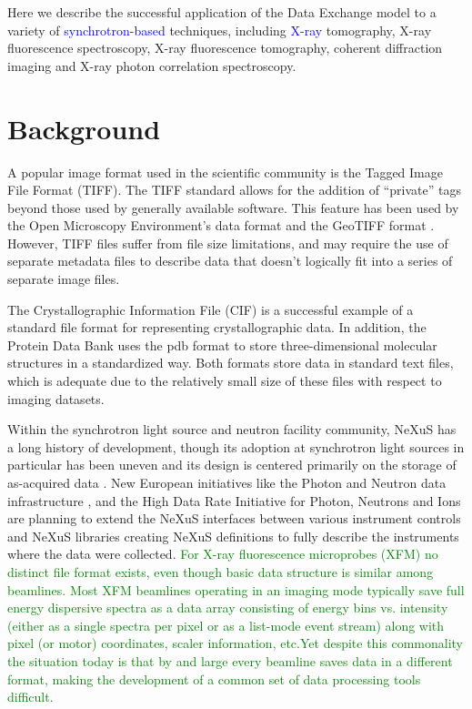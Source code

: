 \documentclass[pdf]{iucr}              %
\begin{document}
Here we describe the successful application of the Data Exchange model to a variety of \textcolor{blue}{synchrotron-based} techniques, including \textcolor{blue}{X-ray} tomography, X-ray fluorescence spectroscopy, X-ray fluorescence tomography, coherent diffraction imaging and X-ray photon correlation spectroscopy.

\section{Background}

A popular image format used in the scientific community is the Tagged Image File Format (TIFF). The TIFF standard allows for the addition of ``private'' tags beyond those used by generally available software. This feature has been used by the Open Microscopy Environment's data format \cite{OME-TIFF} and the GeoTIFF format \cite{GeoTIFF}. However, TIFF files suffer from file size limitations, and may require the use of separate metadata files to describe data that doesn't logically fit into a series of separate image files.

The Crystallographic Information File (CIF) is a successful example of a standard file format for representing crystallographic data. In addition, the Protein Data Bank uses the pdb format \cite{pdb} to store three-dimensional molecular structures in a standardized way. Both formats store data in standard text files, which is adequate due to the relatively small size of these files with respect to imaging datasets.

Within the synchrotron light source and neutron facility community, NeXuS \cite{Tischler1984} has a long history of development, though its adoption at synchrotron light sources in particular has been uneven and its design is centered primarily on the storage of as-acquired data \cite{NeXuS}. New European initiatives like the Photon and Neutron data infrastructure \cite{PanData_2013}, and the High Data Rate Initiative for Photon, Neutrons and Ions \cite{PNI_HDRI_2013} are
planning to extend the NeXuS interfaces between various instrument controls and NeXuS libraries creating NeXuS definitions to fully describe the instruments where the data were collected. 
\textcolor{green}{For X-ray fluorescence microprobes (XFM) no distinct file format exists, even though basic data structure is similar among beamlines. Most XFM beamlines operating in an imaging mode typically save full energy dispersive spectra as a data array consisting of energy bins vs. intensity (either as a single spectra per pixel or as a list-mode event stream) along with pixel (or motor) coordinates, scaler information, etc.Yet despite this commonality the situation today is that by and large every beamline saves data in a different format, making the development of a common set of data processing tools difficult.} 
\end{document}
